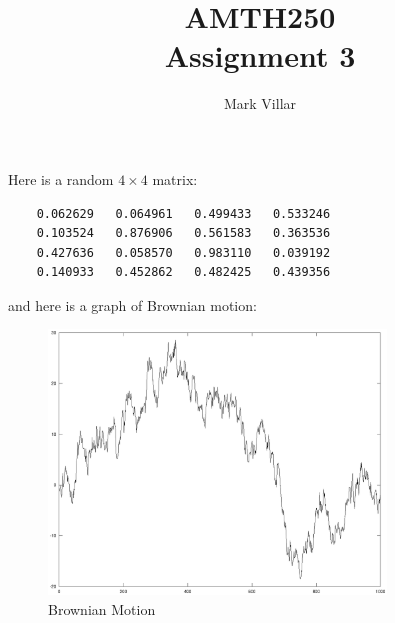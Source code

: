 \documentclass[11pt,a4paper]{article}
\title{AMTH250 \\ Assignment 3}
\author{Mark Villar}
\begin{document}
\maketitle

Here is a random $4 \times 4$ matrix:
\begin{verbatim}
	0.062629   0.064961   0.499433   0.533246
	0.103524   0.876906   0.561583   0.363536
	0.427636   0.058570   0.983110   0.039192
	0.140933   0.452862   0.482425   0.439356
\end{verbatim}
and here is a graph of Brownian motion:

\begin{figure}[!ht]
	\begin{center}
		\includegraphics[width=0.8\textwidth]{brown.eps}
		\caption{Brownian Motion}
	\end{center}
\end{figure}
\end{document}
